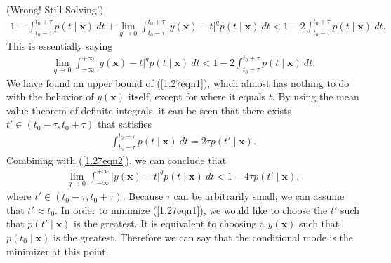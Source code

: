 \begin{answer}{(Wrong! Still Solving!)}
\begin{gather}
		1 - \int_{t_0 - \tau}^{t_0 + \tau} p(t \mid \bm{x})\ dt + \lim_{q \rightarrow 0}\int_{t_0 - \tau}^{t_0 + \tau} \lvert y(\bm{x}) - t \rvert^q p(t \mid \bm{x})\ dt < 1 - 2\int_{t_0 - \tau}^{t_0 + \tau} p(t \mid \bm{x})\ dt.
	\end{gather}
	This is essentially saying
	\begin{align}
		\lim_{q \rightarrow 0} \int_{-\infty}^{+\infty} \lvert y(\bm{x}) - t \rvert^q p(t \mid \bm{x})\ dt < 1 - 2\int_{t_0 - \tau}^{t_0 + \tau} p(t \mid \bm{x})\ dt.\label{1.27eqn2}
	\end{align}
	We have found an upper bound of (\ref{1.27eqn1}), which almost has nothing to do with the behavior of $y(\bm{x})$ itself, except for where it equals $t$. By using the mean value theorem of definite integrals, it can be seen that there exists $t' \in (t_0 - \tau, t_0 + \tau)$ that satisfies
	\begin{align}
		\int_{t_0 - \tau}^{t_0 + \tau} p(t \mid \bm{x})\ dt = 2\tau p(t' \mid \bm{x}).
	\end{align}
	Combining with (\ref{1.27eqn2}), we can conclude that
	\begin{align}
		\lim_{q \rightarrow 0} \int_{-\infty}^{+\infty} \lvert y(\bm{x}) - t \rvert^q p(t \mid \bm{x})\ dt < 1 - 4\tau p(t' \mid \bm{x}),
	\end{align}
	where $t' \in (t_0 - \tau, t_0 + \tau)$. Because $\tau$ can be arbitrarily small, we can assume that $t' \approx t_0$. In order to minimize (\ref{1.27eqn1}), we would like to choose the $t'$ such that $p(t' \mid \bm{x})$ is the greatest. It is equivalent to choosing a $y(\bm{x})$ such that $p(t_0 \mid \bm{x})$ is the greatest. Therefore we can say that the conditional mode is the minimizer at this point.
\end{answer}